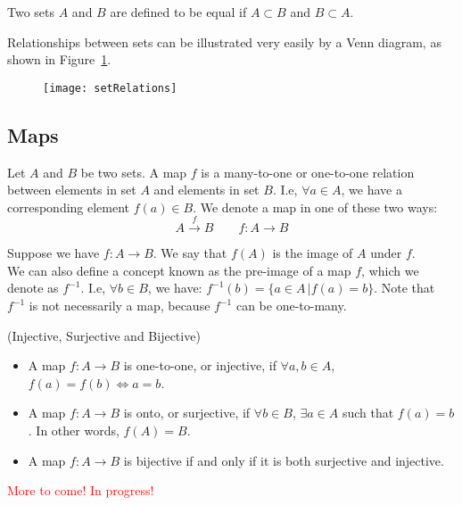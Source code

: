         Two sets $A$ and $B$ are defined to be equal if $A \subset B$ and $B \subset A$.

        Relationships between sets can be illustrated very easily by a Venn
        diagram, as shown in Figure~\ref{fig: set relations}.
        \begin{figure}
          \centering
          \texttt{[image: setRelations]}
          \caption[]{}
          \label{fig: set relations}
        \end{figure}
      \subsection*{Maps}
        \begin{definition}
          Let $A$ and $B$ be two sets. A map $f$ is a many-to-one or
          one-to-one relation between elements in set $A$ and elements in set
          $B$. I.e, $\forall a \in A$, we have a corresponding element $f(a)
          \in B$. We denote a map in one of these two ways:
          \[A \xrightarrow{f} B \quad \quad f: A \rightarrow B\]
        \end{definition}
        \begin{definition}
          Suppose we have $f: A\rightarrow B$. We say that $f(A)$ is the
          image of $A$ under $f$.\\
          We can also define a concept known as the pre-image of a map $f$,
          which we denote as $f^{-1}$. I.e, $\forall b \in B$, we have:
          $f^{-1}(b) = \{a \in A \,|f(a) = b\}$. Note that $f^{-1}$ is not necessarily a map, because $f^{-1}$ can be one-to-many.
        \end{definition}
        \begin{definition}(Injective, Surjective and Bijective)
          \begin{itemize}
            \item{A map $f: A \rightarrow B$ is one-to-one, or injective, if
            $\forall a,b \in A$, $f(a) = f(b) \Leftrightarrow a=b$.}
            \item{A map $f: A \rightarrow B$ is onto, or surjective, if
            $\forall b \in B$, $\exists a \in A$ such that $f(a) = b$. In other words, $f(A) = B$.}
            \item{A map $f: A \rightarrow B$ is bijective if and only if it is both surjective and injective.}
          \end{itemize}
        \end{definition}
        \textcolor{red}{More to come! In progress!}